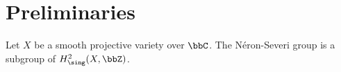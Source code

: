 \section{Preliminaries}

    \begin{proposition}
        Let \(X\) be a smooth projective variety over \(\bbC\).
        The N\'eron-Severi group is a subgroup of \(H^2_{\sing}(X, \bbZ)\).
    \end{proposition}
